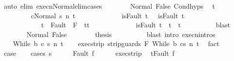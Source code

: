 \begin{isabellebody}
\ {\isacharparenleft}auto\ elim{\isacharcolon}\ execn{\isacharunderscore}Normal{\isacharunderscore}elim{\isacharunderscore}cases{\isacharparenright}\isanewline
\ \ \ \ \ \ \isamarkupfalse%
\ Normal\ False\ Cond{\isachardot}hyps\ \isamarkupfalse%
\ t{\isacharprime}\isanewline
\ \ \ \ \ \ \ \ \ {\isachardoublequoteopen}{\isasymGamma}{\isasymturnstile}{\isasymlangle}c{}{\isacharcomma}Normal\ s{\isacharprime}{\isasymrangle}\ {\isacharequal}n{\isasymRightarrow}\ t{\isacharprime}{\isachardoublequoteclose}\ \isanewline
\ \ \ \ \ \ \ \ \ \ \ \ {\isachardoublequoteopen}isFault\ t\ \ {\isasymlongrightarrow}\ isFault\ t{\isacharprime}{\isachardoublequoteclose}\ \isanewline
\ \ \ \ \ \ \ \ \ \ \ \ {\isachardoublequoteopen}t{\isacharprime}\ {\isasymin}\ Fault\ {\isacharbackquote}\ {\isacharparenleft}{\isacharminus}F{\isacharparenright}\ {\isasymlongrightarrow}\ t{\isacharprime}{\isacharequal}t{\isachardoublequoteclose}\isanewline
\ \ \ \ \ \ \ \ \ \ \ \ {\isachardoublequoteopen}{\isasymnot}\ isFault\ t{\isacharprime}\ {\isasymlongrightarrow}\ t{\isacharprime}\ {\isacharequal}\ t{\isachardoublequoteclose}\isanewline
\ \ \ \ \ \ \ \ \isamarkupfalse%
\ blast\isanewline
\ \ \ \ \ \ \isamarkupfalse%
\ Normal\ False\isanewline
\ \ \ \ \ \ \isamarkupfalse%
\ {\isacharquery}thesis\isanewline
\ \ \ \ \ \ \ \ \isamarkupfalse%
\ {\isacharparenleft}blast\ intro{\isacharcolon}\ execn{\isachardot}intros{\isacharparenright}\isanewline
\ \ \ \ \isamarkupfalse%
\isanewline
\ \ \isamarkupfalse%
\isanewline
{}\isamarkupfalse%
\isanewline
\ \ \isamarkupfalse%
\ {\isacharparenleft}While\ b\ c\ s\ n\ t{\isacharparenright}\isanewline
\ \ \isamarkupfalse%
\ exec{\isacharunderscore}strip{\isacharcolon}\ {\isachardoublequoteopen}{\isasymGamma}{\isasymturnstile}{\isasymlangle}strip{\isacharunderscore}guards\ F\ {\isacharparenleft}While\ b\ c{\isacharparenright}{\isacharcomma}s{\isasymrangle}\ {\isacharequal}n{\isasymRightarrow}\ t{\isachardoublequoteclose}\ \isamarkupfalse%
\ fact\isanewline
\ \ \isamarkupfalse%
\ {\isacharquery}case\isanewline
\ \ \isamarkupfalse%
\ {\isacharparenleft}cases\ s{\isacharparenright}\isanewline
\ \ \ \ \isamarkupfalse%
\ {\isacharparenleft}Fault\ f{\isacharparenright}\isanewline
\ \ \ \ \isamarkupfalse%
\ exec{\isacharunderscore}strip\ \isamarkupfalse%
\ {\isachardoublequoteopen}t{\isacharequal}Fault\ f{\isachardoublequoteclose}\isanewline

\end{isabellebody}

